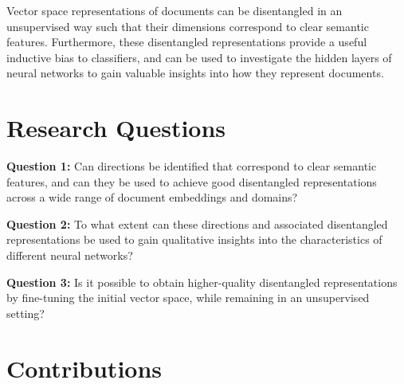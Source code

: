 
Vector space representations of documents can be disentangled  in an unsupervised way such that their dimensions correspond to clear semantic features. Furthermore, these disentangled representations provide a useful inductive bias to classifiers, and can be used to  investigate the hidden layers of neural networks to gain valuable insights into how they represent documents. 


\section{Research Questions} \label{ch2:rq}

\textbf{Question 1:} Can directions be identified that correspond to clear semantic features, and  can they be used to achieve good disentangled representations  across a wide range of document embeddings  and domains?

\textbf{Question 2:} To what extent can these directions and associated disentangled representations be used to gain qualitative insights into the characteristics of different neural networks?

\textbf{Question 3:} Is it possible to obtain higher-quality disentangled representations by fine-tuning the initial vector space, while remaining in an unsupervised setting?

\section{Contributions} \label{ch2:con}  

